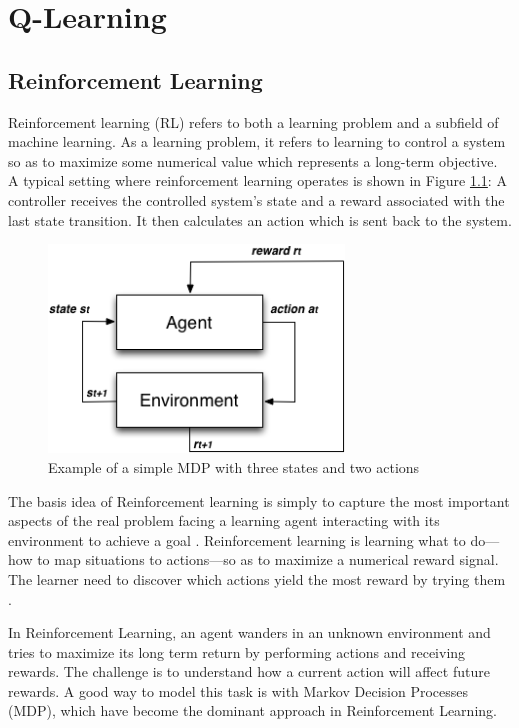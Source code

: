 \chapter{Q-Learning}




\section{Reinforcement Learning}

Reinforcement learning (RL) refers to both a learning problem and a subfield of machine
learning. As a learning problem, it refers to learning to control a system so as to maximize
some numerical value which represents a long-term objective. A typical setting where
reinforcement learning operates is shown in Figure \ref{fig:agentenv}: A controller receives the controlled
system’s state and a reward associated with the last state transition. It then calculates an
action which is sent back to the system.


\begin{figure}
\centering
\includegraphics[width=0.7\textwidth]{./images/agentenv.png}
\caption{Example of a simple MDP with three states and two actions}
\label{fig:agentenv}
\end{figure}


The basis idea of Reinforcement learning  is simply to capture the most important aspects of the real problem facing a learning agent interacting with its environment to achieve a goal \cite{Sutton2012}. Reinforcement learning is learning what to do—how to map situations to actions—so as to maximize a numerical reward signal. The learner need to discover which actions yield the most reward by trying them \cite{Sutton2012}.

In Reinforcement Learning, an agent wanders in an unknown environment and tries to maximize its long term return by performing actions and receiving rewards. The challenge is to understand how a current action will affect future rewards. A good way to model this task is with Markov Decision Processes (MDP), which have become the dominant approach in Reinforcement Learning.

